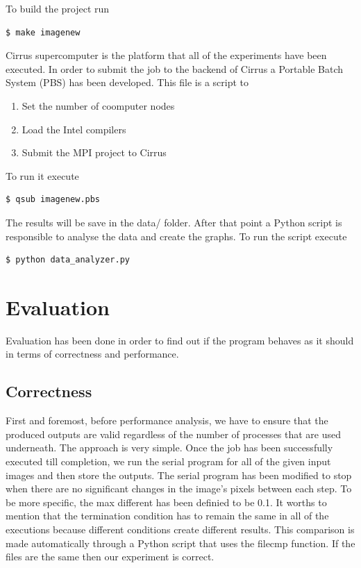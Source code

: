 \documentclass[12pt,a4paper]{article}
\begin{document}
	To build the project run
	\begin{lstlisting}[language=bash]
	$ make imagenew
	\end{lstlisting}
	
	Cirrus supercomputer is the platform that all of the experiments have been executed. In order to submit the job to the backend of Cirrus a Portable Batch System (PBS) has been developed. This file is a script to
	\begin{enumerate}
		\item Set the number of coomputer nodes
		\item Load the Intel compilers 
		\item Submit the MPI project to Cirrus
	\end{enumerate}
	
	To run it execute
	\begin{lstlisting}[language=bash]
	$ qsub imagenew.pbs
	\end{lstlisting}

	The results will be save in the data/ folder. After that point a Python script is responsible to analyse the data and create the graphs. To run the script execute
	\begin{lstlisting}[language=bash]
	$ python data_analyzer.py
	\end{lstlisting}
	
\section{Evaluation}
    Evaluation has been done in order to find out if the program behaves as it should in terms of correctness and performance.

    \subsection{Correctness}
        First and foremost, before performance analysis, we have to ensure that the produced outputs are valid regardless of the number of processes that are used underneath. The approach is very simple. Once the job has been successfully executed till completion, we run the serial program for all of the given input images and then store the outputs. The serial program has been modified to stop when there are no significant changes in the image's pixels between each step. To be more specific, the max different has been definied to be 0.1. It worths to mention that the termination condition has to remain the same in all of the executions because different conditions create different results. This comparison is made automatically through a Python script that uses the filecmp function. If the files are the same then our experiment is correct.
\end{document}

